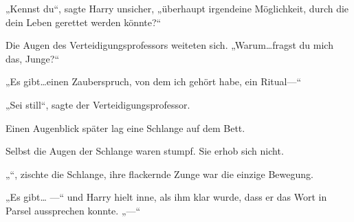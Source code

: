  „Kennst du“, sagte Harry unsicher, „überhaupt irgendeine Möglichkeit, durch die dein Leben gerettet werden könnte?“

Die Augen des Verteidigungsprofessors weiteten sich.
„Warum…fragst du mich das, Junge?“

„Es gibt…einen Zauberspruch, von dem ich gehört habe, ein Ritual—“

„Sei still“, sagte der Verteidigungsprofessor.

Einen Augenblick später lag eine Schlange auf dem Bett.

Selbst die Augen der Schlange waren stumpf. Sie erhob sich nicht.

„“, zischte die Schlange, ihre flackernde Zunge war die einzige Bewegung.

„Es gibt… —“ und Harry hielt inne, als ihm klar wurde, dass er das Wort in Parsel aussprechen konnte.
„—“

